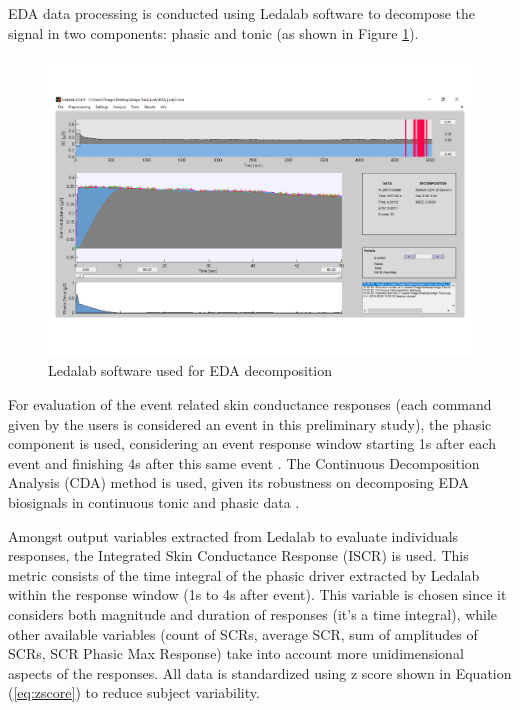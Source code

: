 EDA data processing is conducted using Ledalab software \cite{ledalab2020,e4recom2020} to decompose the signal in two components: phasic and tonic (as shown in Figure \ref{fig:ledalab}). 


\begin{figure}[!hbt]
\begin{center}
\includegraphics[width=1\linewidth]{img/cap4/ledalab}
\caption{Ledalab software used for EDA decomposition} \label{fig:ledalab}
\end{center}
\end{figure}

For evaluation of the event related skin conductance responses (each command given by the users is considered an event in this preliminary study), the phasic component is used, considering an event response window starting 1s after each event and finishing 4s after this same event \cite{khalfa2002}. The Continuous Decomposition Analysis (CDA) method is used, given its robustness on decomposing  EDA biosignals in continuous tonic and phasic data \cite{benedek2010}.

Amongst output variables extracted from Ledalab to evaluate individuals responses, the Integrated Skin Conductance Response (ISCR) is used. This metric consists of the time integral of the phasic driver extracted by Ledalab within the response window (1s to 4s after event). This variable is chosen since it considers both magnitude and duration of responses (it’s a time integral), while other available variables (count of SCRs, average SCR, sum of amplitudes of SCRs, SCR Phasic Max Response) take into account more unidimensional aspects of the responses. All data is standardized using z score shown in Equation (\ref{eq:zscore}) to reduce subject variability.


